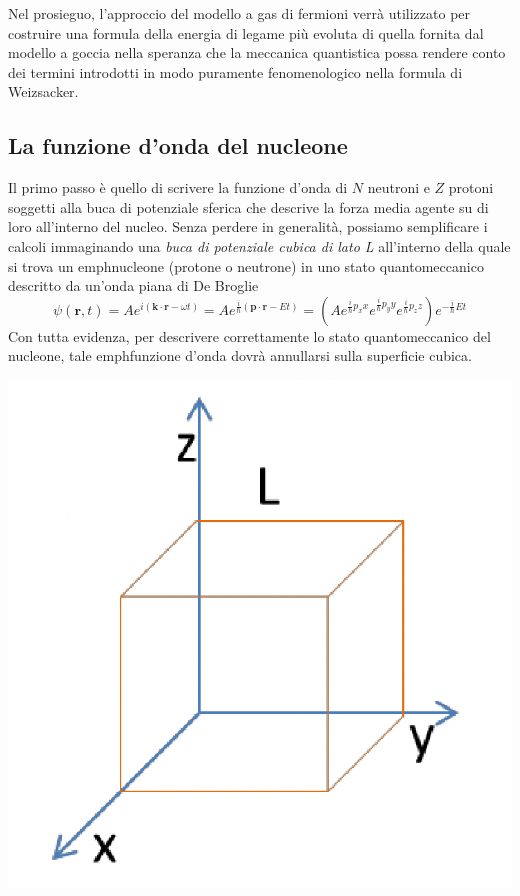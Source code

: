 Nel prosieguo, l’approccio del modello a gas di fermioni verrà utilizzato per costruire una formula della energia di legame più evoluta di quella fornita dal modello a goccia nella speranza che la meccanica quantistica possa rendere conto dei termini introdotti in modo puramente fenomenologico nella formula di Weizsacker.

\subsection{La funzione d'onda del nucleone}\label{sec:funzione-onda-nucleone}

Il primo passo è quello di scrivere la funzione d’onda di $N$ neutroni e $Z$ protoni soggetti alla buca di potenziale sferica che descrive la forza media agente su di loro all’interno del nucleo.
Senza perdere in generalità, possiamo semplificare i calcoli immaginando una \emph{buca di potenziale cubica di lato L} all’interno della quale si trova un emph{nucleone} (protone o neutrone) in uno stato quantomeccanico descritto da un’onda piana di De Broglie
\[
\psi(\bm{r},t) = A e^{ i(\bm{k} \cdot \bm{r} - \omega t) } =
Ae^{ \frac{i}{\hslash} (\bm{p} \cdot \bm{r} -Et)  } =
(Ae^{ \frac{i}{\hslash}p_{x}x }e^{ \frac{i}{\hslash}p_{y}y }e^{ \frac{i}{\hslash}p_{z}z })e^{ - \frac{i}{\hslash}Et }
\]
Con tutta evidenza, per descrivere correttamente lo stato quantomeccanico del nucleone, tale emph{funzione d’onda dovrà annullarsi sulla superficie cubica}.
\begin{marginfigure}
	\includegraphics{figs/cube-fermion-gas1}
\end{marginfigure}
